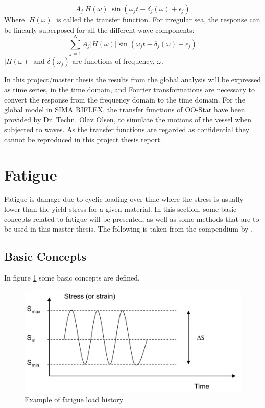 \begin{equation}
    A_j |H(\omega)|\sin(\omega_jt-\delta_j(\omega)+\epsilon_j)
\end{equation}
Where $|H(\omega)|$ is called the transfer function. For irregular sea, the response can be linearly superposed for all the different wave components:
\begin{equation}
    \sum_{j=1}^N  A_j |H(\omega)|\sin(\omega_jt-\delta_j(\omega)+\epsilon_j)
\end{equation}
 $|H(\omega)|$ and $\delta(\omega_j)$ are functions of frequency, $\omega$.\newline 
 \newline


\noindent In this project/master thesis the results from the global analysis will be expressed as time series, in the time domain, and Fourier transformations are necessary to convert the response from the frequency domain to the time domain. \newline
\newline 
\noindent For the global model in SIMA RIFLEX, the transfer functions of OO-Star have been provided by Dr. Techn. Olav Olsen, to simulate the motions of the vessel when subjected to waves. As the transfer functions are regarded as confidential they cannot be reproduced in this project thesis report.   

\section{Fatigue}
Fatigue is damage due to cyclic loading over time where the stress is usually lower than the yield stress for a given material. In this section, some basic concepts related to fatigue will be presented, as well as some methods that are to be used in this master thesis. The following is taken from the compendium by \cite{fatigue2016}. \newline
\newline
\subsection{Basic Concepts}
In figure \ref{fig:fatigue} some basic concepts are defined. 

\begin{figure}[h!]
\centering
\includegraphics[scale=0.6]{figures/cycle}
\caption[$\; \:$Example of fatigue load history]{Example of fatigue load history  \cite{fatigue2016} }
 \label{fig:fatigue}
\end{figure}


